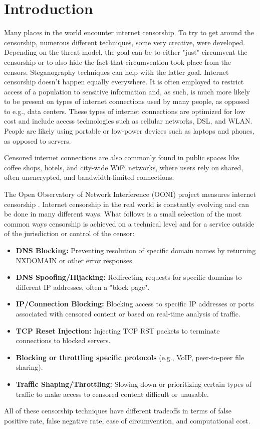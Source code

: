 
\chapter{Introduction}


Many places in the world encounter internet censorship.
To try to get around the censorship, numerous different techniques, some very creative, were developed.
Depending on the threat model, the goal can be to either "just" circumvent the censorship or to also hide the fact that circumvention took place from the censors.
Steganography \cite{wiki:Steganography} techniques \cite{wiki:List_of_steganography_techniques} can help with the latter goal.
Internet censorship doesn't happen equally everywhere.
It is often employed to restrict access of a population to sensitive information and, as such, is much more likely to be present on types of internet connections used by many people, as opposed to e.g., data centers.
These types of internet connections are optimized for low cost and include access technologies such as cellular networks, DSL, and WLAN.
People are likely using portable or low-power devices such as laptops and phones, as opposed to servers.

Censored internet connections are also commonly found in public spaces like coffee shops, hotels, and city-wide WiFi networks, where users rely on shared, often unencrypted, and bandwidth-limited connections.


The Open Observatory of Network Interference (OONI) project measures internet censorship \cite{OONI}.
Internet censorship in the real world is constantly evolving and can be done in many different ways.
What follows is a small selection of the most common ways censorship is achieved on a technical level and for a service outside of the jurisdiction or control of the censor:
\begin{itemize}
	\item \noindent\textbf{DNS Blocking:} Preventing resolution of specific domain names by returning NXDOMAIN or other error responses.
	\item \noindent\textbf{DNS Spoofing/Hijacking:} Redirecting requests for specific domains to different IP addresses, often a "block page".
	\item \noindent\textbf{IP/Connection Blocking:} Blocking access to specific IP addresses or ports associated with censored content or based on real-time analysis of traffic.
	\item \noindent\textbf{TCP Reset Injection:} Injecting TCP RST packets to terminate connections to blocked servers.
	\item \noindent\textbf{Blocking or throttling specific protocols} (e.g., VoIP, peer-to-peer file sharing).
	\item \noindent\textbf{Traffic Shaping/Throttling:} Slowing down or prioritizing certain types of traffic to make access to censored content difficult or unusable.
\end{itemize}
All of these censorship techniques have different tradeoffs in terms of false positive rate, false negative rate, ease of circumvention, and computational cost.

